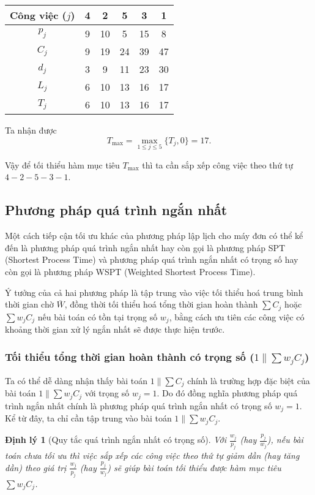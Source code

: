 \documentclass[12pt,a4paper]{report}
\newtheorem{dl}{Định lý}
\begin{document}
\begin{table}[h!]
	\centering
	\begin{tabular}{|c | c c c c c |} 
	\hline
	Công việc ($j$) & 4 & 2 & 5 & 3 & 1 \\
	\hline\hline
	$p_j$ & 9 & 10 & 5 & 15 & 8 \\
	$C_j$ & 9 & 19 & 24 & 39 & 47 \\
	$d_j$ & 3 & 9 & 11 & 23 & 30 \\
	$L_j$ & 6 & 10 & 13 & 16 & 17 \\
	$T_j$ & 6 & 10 & 13 & 16 & 17 \\
	\hline
	\end{tabular}
\end{table}

Ta nhận được
\begin{equation*}
	T_{\max} = \max _{1 \leq j \leq 5} \{T_j, 0\} = 17.
\end{equation*}

Vậy để tối thiểu hàm mục tiêu $T_{\max}$ thì ta cần sắp xếp công việc theo thứ tự $4-2-5-3-1$.
\subsection{Phương pháp quá trình ngắn nhất}
Một cách tiếp cận tối ưu khác của phương pháp lập lịch cho máy đơn có thể kể đến là phương pháp quá trình ngắn nhất hay còn gọi là phương pháp SPT (Shortest Process Time) và phương pháp quá trình ngắn nhất có trọng số hay còn gọi là phương pháp WSPT (Weighted Shortest Process Time).

Ý tưởng của cả hai phương pháp là tập trung vào việc tối thiểu hoá trung bình thời gian chờ $\overline{W}$, đồng thời tối thiểu hoá tổng thời gian hoàn thành $\sum C_j$ hoặc $\sum w_j C_j$ nếu bài toán có tồn tại trọng số $w_j$, bằng cách ưu tiên các công việc có khoảng thời gian xử lý ngắn nhất sẽ được thực hiện trước. 

\subsubsection*{Tối thiểu tổng thời gian hoàn thành có trọng số ($1 \| \sum w_j C_j$)}
Ta có thể dễ dàng nhận thấy bài toán $1 \| \sum C_j$ chính là trường hợp đặc biệt của bài toán $1 \| \sum w_j C_j$ với trọng số $w_j=1$. Do đó đồng nghĩa phương pháp quá trình ngắn nhất chính là phương pháp quá trình ngắn nhất có trọng số $w_j=1$. Kể từ đây, ta chỉ cần tập trung vào bài toán $1\| \sum w_j C_j$.

\begin{dl}[Quy tắc quá trình ngắn nhất có trọng số]
Với $\frac{w_j}{p_j}$ (hay $\frac{p_j}{w_j}$), nếu bài toán chưa tối ưu thì việc sắp xếp các công việc theo thứ tự giảm dần (hay tăng dần) theo giá trị $\frac{w_j}{p_j}$ (hay $\frac{p_j}{w_j}$) sẽ giúp bài toán tối thiểu được hàm mục tiêu $\sum w_j C_j$.
\end{dl}
\end{document}
